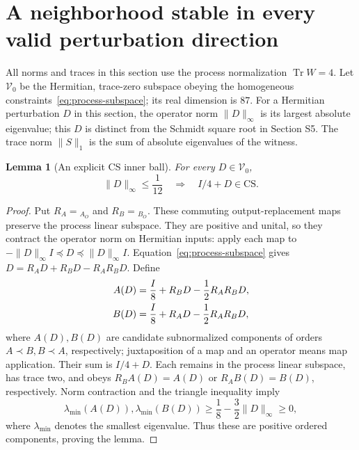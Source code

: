 \documentclass[11pt]{article}
\newcommand{\Tr}{\operatorname{Tr}}
\newcommand{\CS}{\mathrm{CS}}
\newtheorem{lemma}{Lemma}
\begin{document}
\section{A neighborhood stable in every valid perturbation direction}
\label{sec:robustness}
All norms and traces in this section use the process normalization $\Tr W=4$. Let $\mathcal V_0$ be the Hermitian, trace-zero subspace obeying the homogeneous constraints~\eqref{eq:process-subspace}; its real dimension is $87$. For a Hermitian perturbation $D$ in this section, the operator norm $\|D\|_\infty$ is its largest absolute eigenvalue; this $D$ is distinct from the Schmidt square root in Section S5. The trace norm $\|S\|_1$ is the sum of absolute eigenvalues of the witness.

\begin{lemma}[An explicit CS inner ball]
For every $D\in\mathcal V_0$,
\begin{equation}
 \|D\|_\infty\le\frac1{12}
 \quad\Longrightarrow\quad I/4+D\in\CS.
 \label{eq:CS-ball}
\end{equation}
\end{lemma}
\begin{proof}
Put $R_A={}_{A_O}$ and $R_B={}_{B_O}$. These commuting output-replacement maps preserve the process linear subspace. They are positive and unital, so they contract the operator norm on Hermitian inputs: apply each map to $-\|D\|_\infty I\preceq D\preceq\|D\|_\infty I$. Equation~\eqref{eq:process-subspace} gives $D=R_AD+R_BD-R_AR_BD$. Define
\begin{align}
 A(D)&=\frac I8+R_BD-\frac12R_AR_BD,\notag\\
 B(D)&=\frac I8+R_AD-\frac12R_AR_BD,
 \label{eq:CS-ball-split}
\end{align}
where $A(D),B(D)$ are candidate subnormalized components of orders $A\prec B,B\prec A$, respectively; juxtaposition of a map and an operator means map application. Their sum is $I/4+D$. Each remains in the process linear subspace, has trace two, and obeys $R_BA(D)=A(D)$ or $R_AB(D)=B(D)$, respectively. Norm contraction and the triangle inequality imply
\begin{equation}
 \lambda_{\min}(A(D)),\lambda_{\min}(B(D))
 \ge\frac18-\frac32\|D\|_\infty\ge0,
 \label{eq:CS-ball-positivity}
\end{equation}
where $\lambda_{\min}$ denotes the smallest eigenvalue. Thus these are positive ordered components, proving the lemma.
\end{proof}
\end{document}
